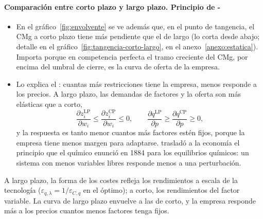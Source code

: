 \documentclass[11pt]{article}
\begin{document}
\paragraph{Comparación entre corto plazo y largo plazo. Principio de -}

\begin{itemize}
\item En el gráfico~\ref{fig:envolvente} se ve además que, en el punto de tangencia, el CMg a corto plazo tiene más pendiente que el de largo (lo corta desde abajo; detalle en el gráfico~\ref{fig:tangencia-corto-largo}, en el anexo~\ref{anexo:estatica}). Importa porque en competencia perfecta el tramo creciente del CMg, por encima del umbral de cierre, es la curva de oferta de la empresa.
\item Lo explica el \nocite{Samuelson1947Foundations}: cuantas más restricciones tiene la empresa, menos responde a los precios. A largo plazo, las demandas de factores y la oferta son más elásticas que a corto,
  \begin{equation}
  \frac{\partial z_i^{\mathrm{LP}}}{\partial w_i}\leq\frac{\partial z_i^{\mathrm{CP}}}{\partial w_i}\leq 0,\qquad \frac{\partial q^{\mathrm{LP}}}{\partial p}\geq\frac{\partial q^{\mathrm{CP}}}{\partial p}\geq 0, \label{eq:le-chatelier}
  \end{equation}
  y la respuesta es tanto menor cuantos más factores estén fijos, porque la empresa tiene menos margen para adaptarse.  trasladó a la economía el principio que el químico  enunció en 1884 para los equilibrios químicos\nocite{LeChatelier1884Enonce}: un sistema con menos variables libres responde menos a una perturbación.
\end{itemize}

\begin{ideaclave}
A largo plazo, la forma de los costes refleja los rendimientos a escala de la tecnología ($\varepsilon_{q,\lambda}=1/\varepsilon_{C,q}$ en el óptimo); a corto, los rendimientos del factor variable. La curva de largo plazo envuelve a las de corto, y la empresa responde más a los precios cuantos menos factores tenga fijos.
\end{ideaclave}
\end{document}
